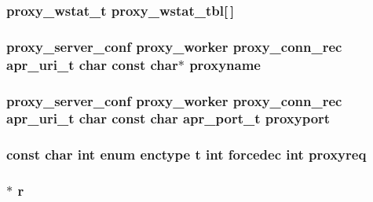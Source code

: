 \subsubsection[{\texorpdfstring{proxy\+\_\+wstat\+\_\+tbl}{proxy_wstat_tbl}}]{ {\bf proxy\+\_\+wstat\+\_\+t} proxy\+\_\+wstat\+\_\+tbl\mbox{[}$\,$\mbox{]}}\hypertarget{group__MOD__PROXY_ga1077b97180eb36b606215d0625e0cfa0}{}\label{group__MOD__PROXY_ga1077b97180eb36b606215d0625e0cfa0}
\subsubsection[{\texorpdfstring{proxyname}{proxyname}}]{ {\bf proxy\+\_\+server\+\_\+conf} {\bf proxy\+\_\+worker} {\bf proxy\+\_\+conn\+\_\+rec} {\bf apr\+\_\+uri\+\_\+t} char const char$\ast$ proxyname}\hypertarget{group__MOD__PROXY_gaa1c038713fefa564c88a58477a1b2001}{}\label{group__MOD__PROXY_gaa1c038713fefa564c88a58477a1b2001}
\subsubsection[{\texorpdfstring{proxyport}{proxyport}}]{ {\bf proxy\+\_\+server\+\_\+conf} {\bf proxy\+\_\+worker} {\bf proxy\+\_\+conn\+\_\+rec} {\bf apr\+\_\+uri\+\_\+t} char const char {\bf apr\+\_\+port\+\_\+t} proxyport}\hypertarget{group__MOD__PROXY_ga9913582faaffe156d1b3b9330f5d0e6e}{}\label{group__MOD__PROXY_ga9913582faaffe156d1b3b9330f5d0e6e}
\subsubsection[{\texorpdfstring{proxyreq}{proxyreq}}]{\setlength{\rightskip}{0pt plus 5cm}const char {\bf int} enum {\bf enctype} {\bf t} {\bf int} forcedec {\bf int} proxyreq}\hypertarget{group__MOD__PROXY_ga7adaa91224b884116382c7c9a5b86ff4}{}\label{group__MOD__PROXY_ga7adaa91224b884116382c7c9a5b86ff4}
\subsubsection[{\texorpdfstring{r}{r}}]{$\ast$ r}\hypertarget{group__MOD__PROXY_gac68e921ed15f71060d618adb662a84f6}{}\label{group__MOD__PROXY_gac68e921ed15f71060d618adb662a84f6}
